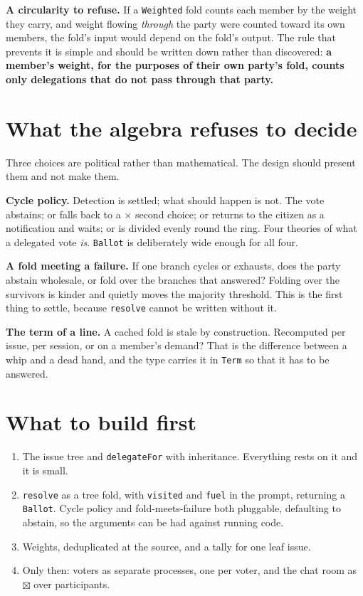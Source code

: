 \documentclass[11pt,a4paper]{article}
\begin{document}
\textbf{A circularity to refuse.} If a \texttt{Weighted} fold counts each member
by the weight they carry, and weight flowing \emph{through} the party were
counted toward its own members, the fold's input would depend on the fold's
output. The rule that prevents it is simple and should be written down rather
than discovered: \textbf{a member's weight, for the purposes of their own party's
fold, counts only delegations that do not pass through that party.}

\section{What the algebra refuses to decide}

Three choices are political rather than mathematical. The design should present
them and not make them.

\textbf{Cycle policy.} Detection is settled; what should happen is not. The vote
abstains; or falls back to a $\times$ second choice; or returns to the citizen as
a notification and waits; or is divided evenly round the ring. Four theories of
what a delegated vote \emph{is}. \texttt{Ballot} is deliberately wide enough for
all four.

\textbf{A fold meeting a failure.} If one branch cycles or exhausts, does the
party abstain wholesale, or fold over the branches that answered? Folding over
the survivors is kinder and quietly moves the majority threshold. This is the
first thing to settle, because \texttt{resolve} cannot be written without it.

\textbf{The term of a line.} A cached fold is stale by construction. Recomputed
per issue, per session, or on a member's demand? That is the difference between
a whip and a dead hand, and the type carries it in \texttt{Term} so that it has
to be answered.

\section{What to build first}

\begin{enumerate}
\item The issue tree and \texttt{delegateFor} with inheritance. Everything rests
  on it and it is small.
\item \texttt{resolve} as a tree fold, with \texttt{visited} and \texttt{fuel} in
  the prompt, returning a \texttt{Ballot}. Cycle policy and fold-meets-failure
  both pluggable, defaulting to abstain, so the arguments can be had against
  running code.
\item Weights, deduplicated at the source, and a tally for one leaf issue.
\item Only then: voters as separate processes, one per voter, and the chat room
  as $\boxtimes$ over participants.
\end{enumerate}
\end{document}
